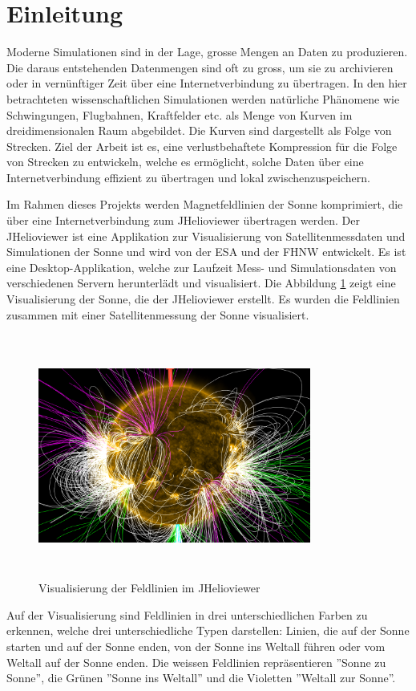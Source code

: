 \section{Einleitung}\label{einleitung}
Moderne Simulationen sind in der Lage, grosse Mengen an Daten zu produzieren. Die daraus entstehenden Datenmengen sind oft zu gross, um sie zu archivieren oder in vernünftiger Zeit über eine Internetverbindung zu übertragen. In den hier betrachteten wissenschaftlichen Simulationen werden natürliche Phänomene wie Schwingungen, Flugbahnen, Kraftfelder etc. als Menge von Kurven im dreidimensionalen Raum abgebildet. Die Kurven sind dargestellt als Folge von Strecken. Ziel der Arbeit ist es, eine verlustbehaftete Kompression für die Folge von Strecken zu entwickeln, welche es ermöglicht, solche Daten über eine Internetverbindung effizient zu übertragen und lokal zwischenzuspeichern.

Im Rahmen dieses Projekts werden Magnetfeldlinien der Sonne komprimiert, die über eine Internetverbindung zum JHelioviewer übertragen werden. Der JHelioviewer ist eine Applikation zur Visualisierung von Satellitenmessdaten und Simulationen der Sonne und wird von der ESA und der FHNW entwickelt. Es ist eine Desktop-Applikation, welche zur Laufzeit Mess- und Simulationsdaten von verschiedenen Servern herunterlädt und visualisiert. Die Abbildung \ref{einleitung::feldlinien} zeigt eine Visualisierung der Sonne, die der JHelioviewer erstellt. Es wurden die Feldlinien zusammen mit einer Satellitenmessung der Sonne visualisiert.

\begin{figure}[!htbp]
\center
	\includegraphics[width=0.8\textwidth,height=8cm,keepaspectratio]{./pictures/einleitung/fieldLines.png}
	\caption{Visualisierung der Feldlinien im JHelioviewer}
	\label{einleitung::feldlinien}
\end{figure}
Auf der Visualisierung sind Feldlinien in drei unterschiedlichen Farben zu erkennen, welche drei unterschiedliche Typen darstellen: Linien, die auf der Sonne starten und auf der Sonne enden, von der Sonne ins Weltall führen oder vom Weltall auf der Sonne enden. Die weissen Feldlinien repräsentieren ''Sonne zu Sonne'', die Grünen ''Sonne ins Weltall'' und die Violetten ''Weltall zur Sonne''.

